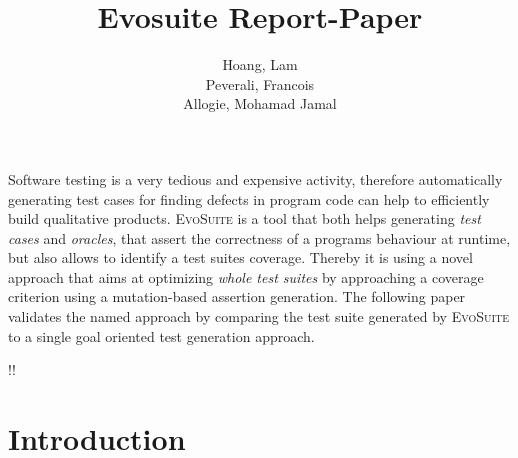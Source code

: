 \documentclass[pdftex,english,oribibl]{llncs}
\title{Evosuite Report-Paper}
\author{Hoang, Lam\\ Peverali, Francois \\ Allogie, Mohamad Jamal}
\institute{Humboldt University of Berlin\\Department of Computer Science\\12489 Berlin, Germany}
\makeatletter
\gdef\@keywords{}
\renewenvironment{abstract}{%
  \list{}{\advance\topsep by0.35cm\relax\small%
          \leftmargin=1cm%
          \labelwidth=\z@%
          \listparindent=\z@%
          \itemindent\listparindent%
          \rightmargin\leftmargin}%
          \item[\hskip\labelsep\bfseries\abstractname]}{%
  \if!\@keywords!\else{\item[~]\item[\hskip\labelsep\bfseries\keywordname]\@keywords}\fi%
  \endlist}
\makeatother
\begin{document}
\maketitle

\begin{abstract}
  Software testing is a very tedious and expensive activity, therefore automatically generating test cases for finding defects in program code can help to efficiently build qualitative products. \textsc{EvoSuite} is a tool that both helps generating \textit{test cases} and \textit{oracles}, that assert the correctness of a programs behaviour at runtime, but also allows to identify a test suites coverage. Thereby it is using a novel approach that aims at optimizing \textit{whole test suites} by approaching a coverage criterion using a mutation-based assertion generation. The following paper validates  the named approach by comparing the test suite generated by \textsc{EvoSuite} to a single goal oriented test generation approach.
  
\end{abstract}

\section{Introduction}
\end{document}
